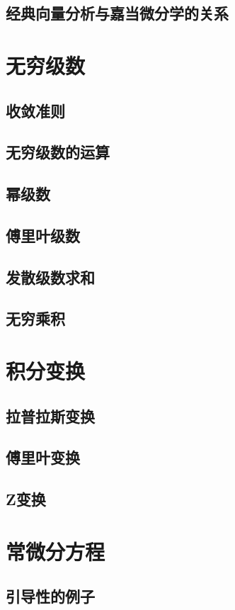 \section{经典向量分析与嘉当微分学的关系}

\chapter{无穷级数}
\section{收敛准则}
\section{无穷级数的运算}
\section{幂级数}
\section{傅里叶级数}
\section{发散级数求和}
\section{无穷乘积}

\chapter{积分变换}
\section{拉普拉斯变换}
\section{傅里叶变换}
\section{Z变换}

\chapter{常微分方程}
\section{引导性的例子}
